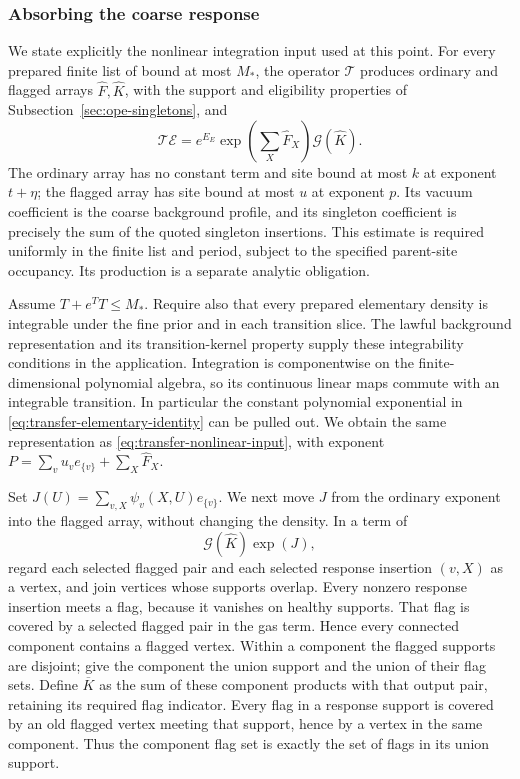 \subsubsection{Absorbing the coarse response}
We state explicitly the nonlinear integration input used at this
point. For every prepared finite list of bound at most $M_*$,
the operator $\mathcal T$ produces ordinary and flagged arrays
$\widehat F,\widehat K$, with the support and eligibility properties
of Subsection~\ref{sec:ope-singletons}, and
\begin{equation}\label{eq:transfer-nonlinear-input}
 \mathcal T\mathcal E
       =e^{E_E}\exp\left(\sum_X\widehat F_X\right)
                                       \mathcal G(\widehat K).
\end{equation}
The ordinary array has no constant term and site bound at most
$k$ at exponent $t+\eta$; the flagged array has site bound at
most $u$ at exponent $p$. Its vacuum coefficient is the coarse
background profile, and its singleton coefficient is precisely
the sum of the quoted singleton insertions. This estimate is
required uniformly in the finite list and period, subject to the
specified parent-site occupancy. Its production is a separate
analytic obligation.

Assume $T+e^TT\le M_*$. Require also that every prepared
elementary density is integrable under the fine prior and in
each transition slice. The lawful background representation and
its transition-kernel property supply these integrability
conditions in the application. Integration is componentwise on the
finite-dimensional polynomial algebra, so its continuous linear
maps commute with an integrable transition. In particular the
constant polynomial exponential in
\eqref{eq:transfer-elementary-identity} can be pulled out. We
obtain the same representation as
\eqref{eq:transfer-nonlinear-input}, with exponent
$P=\sum_vu_ve_{\{v\}}+\sum_X\widehat F_X$.

Set $J(U)=\sum_{v,X}\psi_v(X,U)e_{\{v\}}$. We next move $J$
from the ordinary exponent into the flagged array, without changing
the density. In a term of
\[
                   \mathcal G(\widehat K)\exp(J),
\]
regard each selected flagged pair and each selected response
insertion $(v,X)$ as a vertex, and join vertices whose supports
overlap. Every nonzero response insertion meets a flag, because it
vanishes on healthy supports. That flag is covered by a selected
flagged pair in the gas term. Hence every connected component
contains a flagged vertex. Within a component the flagged supports
are disjoint; give the component the union support and the union
of their flag sets. Define $\overline K$ as the sum of these
component products with that output pair, retaining its required
flag indicator. Every flag in a response support is covered by
an old flagged vertex meeting that support, hence by a vertex
in the same component. Thus the component flag set is exactly
the set of flags in its union support.

